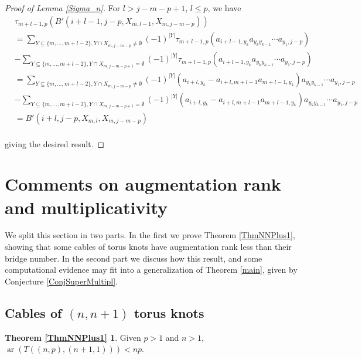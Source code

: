\documentclass[11pt]{amsart}
\def\ar{\operatorname{ar}}
\theoremstyle{definition}
\begin{document}
\begin{proof} [Proof of Lemma \ref{Sigma_n}]
For $l > j-m-p + 1$, $l\le p$, we have
\begin{align*}
&\tau_{m + l - 1,p}( B'(i+l-1,j-p,X_{m,l-1},X_{m,j-m-p}))\\
&= \sum_{Y\subseteq \{m,\ldots,m+l-2\},Y\cap X_{m,j-m-p}\ne\emptyset}(-1)^{|Y|}\tau_{m + l - 1,p}(a_{i+l-1,y_k}a_{y_ky_{k-1}}\cdots a_{y_1,j-p})\\
& - \sum_{Y\subseteq \{m,\ldots,m+l-2\},Y\cap X_{m,j-m-p+1}=\emptyset}(-1)^{|Y|}\tau_{m + l - 1,p}(a_{i+l-1,y_k}a_{y_ky_{k-1}}\cdots a_{y_1,j-p})\\
&= \sum_{Y\subseteq \{m,\ldots,m+l-2\},Y\cap X_{m,j-m-p}\ne\emptyset}(-1)^{|Y|}(a_{i+l,y_k} - a_{i+l,m+l-1}a_{m+l-1,y_k})a_{y_ky_{k-1}}\cdots a_{y_1,j-p}\\
& - \sum_{Y\subseteq \{m,\ldots,m+l-2\},Y\cap X_{m,j-m-p+1}=\emptyset}(-1)^{|Y|}(a_{i+l,y_k} - a_{i+l,m+l-1}a_{m+l-1,y_k})a_{y_ky_{k-1}}\cdots a_{y_1,j-p}\\
&= B'(i+l,j-p,X_{m,l},X_{m,j-m-p})\\
\end{align*}

giving the desired result.
\end{proof}

\section{Comments on augmentation rank and multiplicativity}
\label{SecComments}

We split this section in two parts. In the first we prove Theorem \ref{ThmNNPlus1}, showing that some cables of torus knots have augmentation rank less than their bridge number. In the second part we discuss how this result, and some computational evidence may fit into a generalization of Theorem \ref{main}, given by Conjecture \ref{ConjSuperMultipl}.

\subsection{Cables of $(n,n+1)$ torus knots}
\label{SecNNPlus1}

\newtheorem*{ThmNNPlus1}{Theorem \ref{ThmNNPlus1}}
\begin{ThmNNPlus1}Given $p>1$ and $n>1$, $\ar(T((n,p),(n+1,1))) < np$.
\end{ThmNNPlus1}
\end{document}
